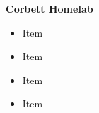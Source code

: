 \textbf{{Corbett Homelab} \hfill} \par
\begin{itemize}
	\item Item
    \item Item
    \item Item
    \item Item
\end{itemize}\vspace{0.1cm}\par